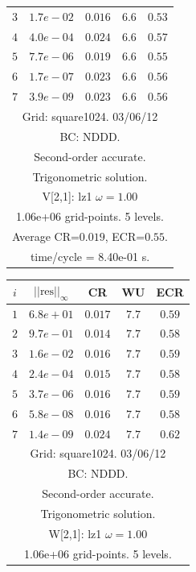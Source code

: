 \begin{table}[hbt]
\begin{center}
{\begin{tabular}{|c|c|c|c|c|}
 $ 3$  & $ 1.7e-02$ & $0.016$ & $ 6.6$ & $0.53$ \\ 
 $ 4$  & $ 4.0e-04$ & $0.024$ & $ 6.6$ & $0.57$ \\ 
 $ 5$  & $ 7.7e-06$ & $0.019$ & $ 6.6$ & $0.55$ \\ 
 $ 6$  & $ 1.7e-07$ & $0.023$ & $ 6.6$ & $0.56$ \\ 
 $ 7$  & $ 3.9e-09$ & $0.023$ & $ 6.6$ & $0.56$ \\ 
\hline 
\multicolumn{5}{|c|}{Grid: square1024. 03/06/12}  \\
\multicolumn{5}{|c|}{BC: NDDD.}  \\
\multicolumn{5}{|c|}{Second-order accurate.}  \\
\multicolumn{5}{|c|}{Trigonometric solution.}  \\
\multicolumn{5}{|c|}{V[2,1]: lz1 $\omega=1.00$}  \\
\multicolumn{5}{|c|}{1.06e+06 grid-points. 5 levels.}  \\
\multicolumn{5}{|c|}{Average CR=$0.019$, ECR=$0.55$.}  \\
\multicolumn{5}{|c|}{time/cycle = 8.40e-01 s.}  \\
\hline 
\end{tabular}
\begin{tabular}{|c|c|c|c|c|} \hline 
 $i$   & $\vert\vert\mbox{res}\vert\vert_\infty$  &  CR     &  WU    & ECR  \\   \hline 
 $ 1$  & $ 6.8e+01$ & $0.017$ & $ 7.7$ & $0.59$ \\ 
 $ 2$  & $ 9.7e-01$ & $0.014$ & $ 7.7$ & $0.58$ \\ 
 $ 3$  & $ 1.6e-02$ & $0.016$ & $ 7.7$ & $0.59$ \\ 
 $ 4$  & $ 2.4e-04$ & $0.015$ & $ 7.7$ & $0.58$ \\ 
 $ 5$  & $ 3.7e-06$ & $0.016$ & $ 7.7$ & $0.59$ \\ 
 $ 6$  & $ 5.8e-08$ & $0.016$ & $ 7.7$ & $0.58$ \\ 
 $ 7$  & $ 1.4e-09$ & $0.024$ & $ 7.7$ & $0.62$ \\ 
\hline 
\multicolumn{5}{|c|}{Grid: square1024. 03/06/12}  \\
\multicolumn{5}{|c|}{BC: NDDD.}  \\
\multicolumn{5}{|c|}{Second-order accurate.}  \\
\multicolumn{5}{|c|}{Trigonometric solution.}  \\
\multicolumn{5}{|c|}{W[2,1]: lz1 $\omega=1.00$}  \\
\multicolumn{5}{|c|}{1.06e+06 grid-points. 5 levels.}  \\

\end{tabular}}
\end{center}
\end{table}
